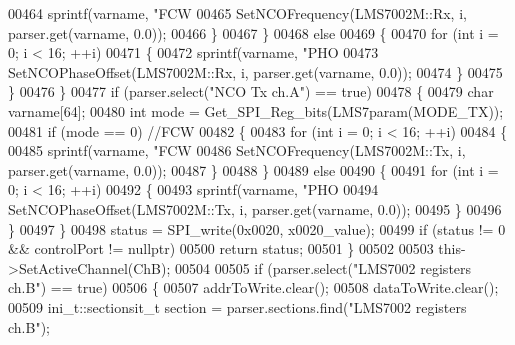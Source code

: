 \begin{DoxyCode}
{{{{00464                         sprintf(varname, \textcolor{stringliteral}{"FCW%
00465                         SetNCOFrequency(LMS7002M::Rx, i, parser.get(varname, 0.0));
00466                     \}
00467                 \}
00468                 \textcolor{keywordflow}{else}
00469                 \{
00470                     \textcolor{keywordflow}{for} (\textcolor{keywordtype}{int} i = 0; i < 16; ++i)
00471                     \{
00472                         sprintf(varname, \textcolor{stringliteral}{"PHO%
00473                         SetNCOPhaseOffset(LMS7002M::Rx, i, parser.get(varname, 0.0));
00474                     \}
00475                 \}
00476             \}
00477             \textcolor{keywordflow}{if} (parser.select(\textcolor{stringliteral}{"NCO Tx ch.A"}) == \textcolor{keyword}{true})
00478             \{
00479                 \textcolor{keywordtype}{char} varname[64];
00480                 \textcolor{keywordtype}{int} mode = Get_SPI_Reg_bits(LMS7param(MODE_TX));
00481                 \textcolor{keywordflow}{if} (mode == 0) \textcolor{comment}{//FCW}
00482                 \{
00483                     \textcolor{keywordflow}{for} (\textcolor{keywordtype}{int} i = 0; i < 16; ++i)
00484                     \{
00485                         sprintf(varname, \textcolor{stringliteral}{"FCW%
00486                         SetNCOFrequency(LMS7002M::Tx, i, parser.get(varname, 0.0));
00487                     \}
00488                 \}
00489                 \textcolor{keywordflow}{else}
00490                 \{
00491                     \textcolor{keywordflow}{for} (\textcolor{keywordtype}{int} i = 0; i < 16; ++i)
00492                     \{
00493                         sprintf(varname, \textcolor{stringliteral}{"PHO%
00494                         SetNCOPhaseOffset(LMS7002M::Tx, i, parser.get(varname, 0.0));
00495                     \}
00496                 \}
00497             \}
00498             status = SPI_write(0x0020, x0020\_value);
00499             \textcolor{keywordflow}{if} (status != 0 && controlPort != \textcolor{keyword}{nullptr})
00500                 \textcolor{keywordflow}{return} status;
00501         \}
00502 
00503         this->SetActiveChannel(ChB);
00504 
00505         \textcolor{keywordflow}{if} (parser.select(\textcolor{stringliteral}{"LMS7002 registers ch.B"}) == \textcolor{keyword}{true})
00506         \{
00507             addrToWrite.clear();
00508             dataToWrite.clear();
00509             ini\_t::sectionsit\_t section = parser.sections.find(\textcolor{stringliteral}{"LMS7002 registers ch.B"});
}}}}}}}}
\end{DoxyCode}
